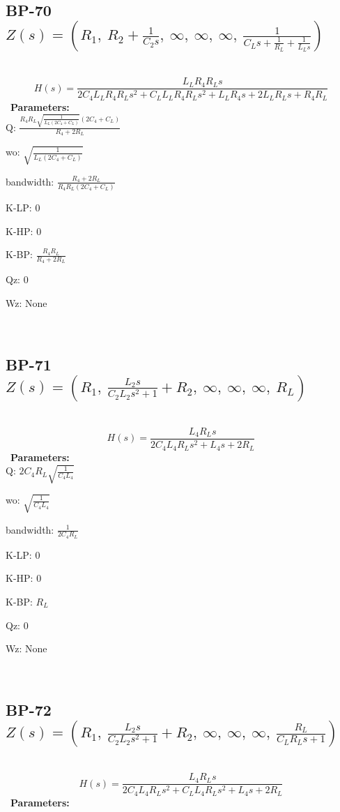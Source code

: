 \documentclass{article}
\begin{document}
\ 

\subsection{BP-70 $Z(s) = \left( R_{1}, \  R_{2} + \frac{1}{C_{2} s}, \  \infty, \  \infty, \  \infty, \  \frac{1}{C_{L} s + \frac{1}{R_{L}} + \frac{1}{L_{L} s}}\right)$ } \ 
\textbf{\[H(s) = \frac{L_{L} R_{4} R_{L} s}{2 C_{4} L_{L} R_{4} R_{L} s^{2} + C_{L} L_{L} R_{4} R_{L} s^{2} + L_{L} R_{4} s + 2 L_{L} R_{L} s + R_{4} R_{L}}\] } \ 
\textbf{Parameters:}\\ 

Q: $\frac{R_{4} R_{L} \sqrt{\frac{1}{L_{L} \left(2 C_{4} + C_{L}\right)}} \left(2 C_{4} + C_{L}\right)}{R_{4} + 2 R_{L}}$\ 

wo: $\sqrt{\frac{1}{L_{L} \left(2 C_{4} + C_{L}\right)}}$\ 

bandwidth: $\frac{R_{4} + 2 R_{L}}{R_{4} R_{L} \left(2 C_{4} + C_{L}\right)}$\ 

K-LP: $0$\ 

K-HP: $0$\ 

K-BP: $\frac{R_{4} R_{L}}{R_{4} + 2 R_{L}}$\ 

Qz: $0$\ 

Wz: $\text{None}$\ 

\ 

\subsection{BP-71 $Z(s) = \left( R_{1}, \  \frac{L_{2} s}{C_{2} L_{2} s^{2} + 1} + R_{2}, \  \infty, \  \infty, \  \infty, \  R_{L}\right)$ } \ 
\textbf{\[H(s) = \frac{L_{4} R_{L} s}{2 C_{4} L_{4} R_{L} s^{2} + L_{4} s + 2 R_{L}}\] } \ 
\textbf{Parameters:}\\ 

Q: $2 C_{4} R_{L} \sqrt{\frac{1}{C_{4} L_{4}}}$\ 

wo: $\sqrt{\frac{1}{C_{4} L_{4}}}$\ 

bandwidth: $\frac{1}{2 C_{4} R_{L}}$\ 

K-LP: $0$\ 

K-HP: $0$\ 

K-BP: $R_{L}$\ 

Qz: $0$\ 

Wz: $\text{None}$\ 

\ 

\subsection{BP-72 $Z(s) = \left( R_{1}, \  \frac{L_{2} s}{C_{2} L_{2} s^{2} + 1} + R_{2}, \  \infty, \  \infty, \  \infty, \  \frac{R_{L}}{C_{L} R_{L} s + 1}\right)$ } \ 
\textbf{\[H(s) = \frac{L_{4} R_{L} s}{2 C_{4} L_{4} R_{L} s^{2} + C_{L} L_{4} R_{L} s^{2} + L_{4} s + 2 R_{L}}\] } \ 
\textbf{Parameters:}\\ 
\end{document}
